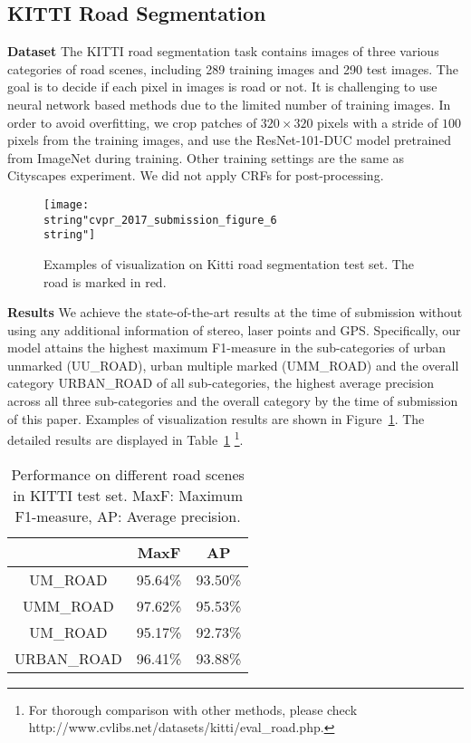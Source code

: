 \documentclass[10pt,twocolumn,letterpaper]{article}
\begin{document}
\subsection{KITTI Road Segmentation}
\textbf{Dataset} The KITTI road segmentation task contains images of three various categories of road scenes, including 289 training images and 290 test images. The goal is to decide if each pixel in images is road or not. It is challenging to use neural network based methods due to the limited number of training images. In order to avoid overfitting, we crop patches of $320 \times 320$ pixels with a stride of $100$ pixels from the training images, and use the ResNet-101-DUC model pretrained from ImageNet during training. Other training settings are the same as Cityscapes experiment. We did not apply CRFs for post-processing.
\begin{figure}[h]
\begin{center}
\texttt{[image: \\string"cvpr\_2017\_submission\_figure\_6\\string"]}
\end{center}
\caption{Examples of visualization on Kitti road segmentation test set. The road is marked in red.}
\label{Figure6_kitti}
\vspace{-7pt}
\end{figure}

\textbf{Results} We achieve the state-of-the-art results at the time of submission without using any additional information of stereo, laser points and GPS. Specifically, our model attains the highest maximum F1-measure in the sub-categories of  urban unmarked ({UU\_ROAD}), urban multiple marked ({UMM\_ROAD}) and the overall category {URBAN\_ROAD} of all sub-categories, the highest average precision across all three sub-categories and the overall category by the time of submission of this paper. Examples of visualization results are shown in Figure~\ref{Figure6_kitti}. The detailed results are displayed in Table~\ref{tab:kitti} \footnote{For thorough comparison with other methods, please check http://www.cvlibs.net/datasets/kitti/eval\_road.php.}.

\begin{table}[ht]
\begin{center}
\begin{tabular}{c|cc} \toprule[1.5pt]
    & MaxF & AP\\ \midrule{UM\_ROAD} & 95.64\% &	93.50\% \\
  {UMM\_ROAD} & 97.62\% & 95.53\% \\
  {UM\_ROAD} & 95.17\% &	92.73\% \\ \midrule[1.25pt]{URBAN\_ROAD} & 96.41\% & 93.88\% \\ \bottomrule[1.5pt]
\end{tabular}
\vspace{2pt}
\caption{Performance on different road scenes in KITTI test set. MaxF: Maximum F1-measure, AP: Average precision.}
\label{tab:kitti}
\end{center}
\vspace{-15pt}
\end{table}
\end{document}
